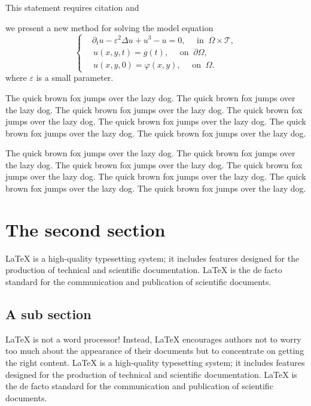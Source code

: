 \documentclass[openany,twoside,12pt]{book}
\theoremstyle{plain}
\numberwithin{equation}{chapter}
\numberwithin{figure}{chapter}
\numberwithin{table}{chapter}
\begin{document}
This statement requires citation \cite{Adams2003} and \cite{Shen1994,Tadmor2012,TreWei2014}


we present a new method for solving the model equation
\begin{equation}\label{eq:mulequ}
\left\{\begin{aligned}
  & \partial_{t} u-\varepsilon^{2} \Delta u+u^{3}-u=0, \quad \text{ in } ~\Omega\times\mathcal{T}, \\
  &\, u(x,y,t) = g(t), \quad \text{ on } ~ \partial \Omega, \\
  &\, u(x,y,0)=\varphi(x, y), \quad \text{ on } ~\Omega.
\end{aligned}\right.
\end{equation}
where $\varepsilon$ is a small parameter.

The quick brown fox jumps over the lazy dog. The quick brown fox jumps over the lazy dog. The quick brown fox jumps over the lazy dog. The quick brown fox jumps over the lazy dog. The quick brown fox jumps over the lazy dog. The quick brown fox jumps over the lazy dog. The quick brown fox jumps over the lazy dog.

The quick brown fox jumps over the lazy dog. The quick brown fox jumps over the lazy dog. The quick brown fox jumps over the lazy dog. The quick brown fox jumps over the lazy dog. The quick brown fox jumps over the lazy dog. The quick brown fox jumps over the lazy dog. The quick brown fox jumps over the lazy dog.


\section{The second section}
LaTeX is a high-quality typesetting system; it includes features designed for the production of technical and scientific documentation. LaTeX is the de facto standard for the communication and publication of scientific documents.

\subsection{A sub section}
LaTeX is not a word processor! Instead, LaTeX encourages authors not to worry too much about the appearance of their documents but to concentrate on getting the right content. LaTeX is a high-quality typesetting system; it includes features designed for the production of technical and scientific documentation. LaTeX is the de facto standard for the communication and publication of scientific documents.
\end{document}
